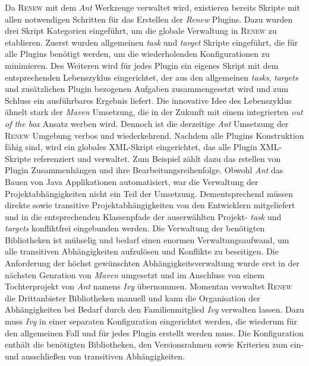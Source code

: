 		Da \textsc{Renew} mit dem \textit{Ant} Werkzeuge verwaltet wird, existieren bereits Skripte mit allen notwendigen Schritten für das Erstellen der \textit{Renew} Plugins. Dazu wurden drei Skript Kategorien eingeführt, um die globale Verwaltung in \textsc{Renew} zu etablieren. Zuerst wurden allgemeinen \textit{task} und \textit{target} Skripte eingeführt, die für alle Plugins benötigt werden, um die wiederholenden Konfigurationen zu minimieren. Des Weiteren wird für jedes Plugin ein eigenes Skript mit dem entsprechenden Lebenszyklus eingerichtet, der aus den allgemeinen \textit{tasks}, \textit{targets} und zusätzlichen Plugin bezogenen Aufgaben zusammengesetzt wird und zum Schluss ein ausführbares Ergebnis liefert. Die innovative Idee des Lebenszyklus ähnelt stark der \textit{Maven} Umsetzung, die in der Zukunft mit einem integrierten \textit{out of the box} Ansatz werben wird. Dennoch ist die derzeitige \textit{Ant} Umsetzung der \textsc{Renew} Umgebung verbos und wiederkehrend. \newline
		Nachdem alle Plugins Konstruktion fähig sind, wird ein globales XML-Skript eingerichtet, das alle Plugin XML-Skripte referenziert und verwaltet. Zum Beispiel zählt dazu das rstellen von Plugin Zusammenhängen und ihre Bearbeitungsreihenfolge.\bigbreak
		Obwohl \textit{Ant} das Bauen von Java Applikationen automatisiert, war die Verwaltung der Projektabhängigkeiten nicht ein Teil der Umsetzung. Dementsprechend müssen direkte sowie transitive Projektabhängigkeiten von den Entwicklern mitgeliefert und in die entsprechenden Klassenpfade der auserwählten Projekt- \textit{task} und \textit{targets} konfliktfrei eingebunden werden.\newline
		Die Verwaltung der benötigten Bibliotheken ist mühselig und bedarf einen enormen Verwaltungsaufwand, um alle transitiven Abhängigkeiten aufzulösen und Konflikte zu beseitigen. Die Anforderung der höchst gewünschten Abhängigkeitsverwaltung wurde erst in der nächsten Genration von \textit{Maven} umgesetzt und im Anschluss von einem Tochterprojekt von \textit{Ant} namens \textit{Ivy} übernommen.\newline
		Momentan verwaltet \textsc{Renew} die Drittanbieter Bibliotheken manuell und kann die Organisation der Abhängigkeiten bei Bedarf durch den Familienmitglied \textit{Ivy} verwalten lassen. Dazu muss \textit{Ivy} in einer separaten Konfiguration eingerichtet werden, die wiederum für den allgemeinen Fall und für jedes Plugin erstellt werden muss. Die Konfiguration enthält die benötigten Bibliotheken, den Versionsrahmen sowie Kriterien zum ein- und ausschließen von transitiven Abhängigkeiten. \newline
